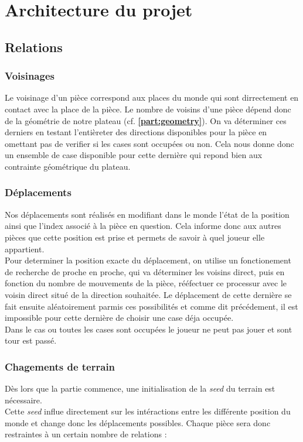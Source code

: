 \chapter{Architecture du projet}
\section{Relations}
    \subsection{Voisinages}
        Le voisinage d'un pièce correspond aux places du monde qui sont dirrectement en contact avec la place de la pièce. Le nombre de voisins d'une pièce dépend donc de la géométrie de notre plateau (cf. \textbf{\ref{part:geometry}}). On va déterminer ces derniers en testant l'entièreter des directions disponibles pour la pièce en omettant pas de verifier si les cases sont occupées ou non. Cela nous donne donc un ensemble de case disponible pour cette dernière qui repond bien aux contrainte géométrique du plateau.
    \subsection{Déplacements}
        Nos déplacements sont réalisés en modifiant dans le monde l'état de la position ainsi que l'index associé à la pièce en question. Cela informe donc aux autres pièces que cette position est prise et permets de savoir à quel joueur elle appartient.\\
        Pour determiner la position exacte du déplacement, on utilise un fonctionement de recherche de proche en proche, qui va déterminer les voisins direct, puis en fonction du nombre de mouvements de la pièce, rééfectuer ce processur avec le voisin direct situé de la direction souhaitée. Le déplacement de cette dernière se fait ensuite aléatoirement parmis ces possibilités et comme dit précédement, il est impossible pour cette dernière de choisir une case déja occupée. \\
        Dans le cas ou toutes les cases sont occupées le joueur ne peut pas jouer et sont tour est passé.
        
    \subsection{Chagements de terrain}
        Dès lors que la partie commence, une initialisation de la \textit{seed} du terrain est nécessaire. \\
        Cette \textit{seed} influe directement sur les intéractions entre les différente position du monde et change donc les déplacements possibles. Chaque pièce sera donc restraintes à un certain nombre de relations : \\
        
